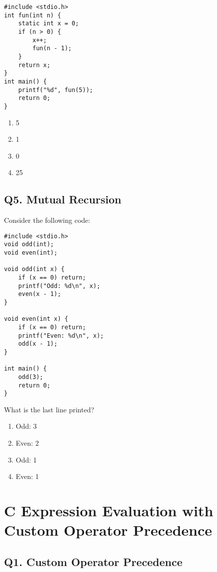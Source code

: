 \begin{lstlisting}
#include <stdio.h>
int fun(int n) {
    static int x = 0;
    if (n > 0) {
        x++;
        fun(n - 1);
    }
    return x;
}
int main() {
    printf("%d", fun(5));
    return 0;
}
\end{lstlisting}

\begin{enumerate}[label=(\alph*)]
    \item 5
    \item 1
    \item 0
    \item 25
\end{enumerate}

\vspace{1em}
\subsection*{Q5. Mutual Recursion}
Consider the following code:

\begin{lstlisting}
#include <stdio.h>
void odd(int);
void even(int);

void odd(int x) {
    if (x == 0) return;
    printf("Odd: %d\n", x);
    even(x - 1);
}

void even(int x) {
    if (x == 0) return;
    printf("Even: %d\n", x);
    odd(x - 1);
}

int main() {
    odd(3);
    return 0;
}
\end{lstlisting}

What is the last line printed?

\begin{enumerate}[label=(\alph*)]
    \item Odd: 3
    \item Even: 2
    \item Odd: 1
    \item Even: 1
\end{enumerate}
\newpage
\section{C Expression Evaluation with Custom Operator Precedence}

\subsection*{Q1. Custom Operator Precedence}

